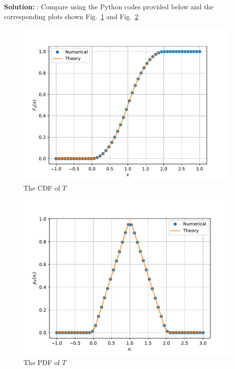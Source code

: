 \documentclass[12pt]{book}
\newcommand\figref{Fig.~\ref}
\newcommand{\solution}{\noindent \textbf{Solution: }}
\begin{document}
\begin{enumerate}
\solution : Compare using the Python codes provided below and the corresponding plots shown \figref{fig:trii_cdf} and \figref{fig:trii_pdf}
\begin{center}
\end{center}
\begin{figure}[H]
\centering
\includegraphics[width=110mm,scale=1]{./figs/2/2.4.4a.pdf}
\caption{The CDF of $T$}
\label{fig:trii_cdf}
\end{figure}
\begin{figure}[H]
\centering
\includegraphics[width=\columnwidth]{./figs/2/2.4.4b.pdf}
\caption{The PDF of $T$}
\label{fig:trii_pdf}
\end{figure}
\end{enumerate}
\end{document}
